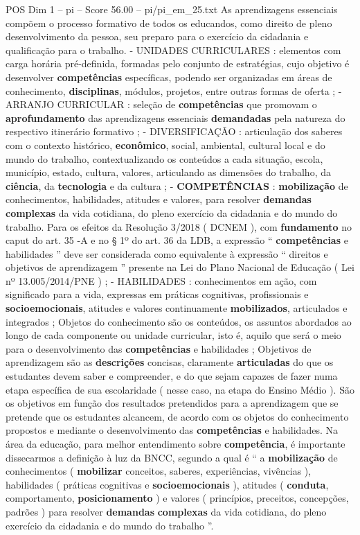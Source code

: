 \begin{textsample}{POS Dim 1 – pi – Score 56.00 – pi/pi\_em\_25.txt}
As aprendizagens essenciais compõem o processo formativo de todos os educandos, como direito de pleno desenvolvimento da pessoa, seu preparo para o exercício da cidadania e qualificação para o trabalho. - UNIDADES CURRICULARES : elementos com carga horária pré-definida, formadas pelo conjunto de estratégias, cujo objetivo é desenvolver \textbf{competências} específicas, podendo ser organizadas em áreas de conhecimento, \textbf{disciplinas}, módulos, projetos, entre outras formas de oferta ; - ARRANJO CURRICULAR : seleção de \textbf{competências} que promovam o \textbf{aprofundamento} das aprendizagens essenciais \textbf{demandadas} pela natureza do respectivo itinerário formativo ; - DIVERSIFICAÇÃO : articulação dos saberes com o contexto histórico, \textbf{econômico}, social, ambiental, cultural local e do mundo do trabalho, contextualizando os conteúdos a cada situação, escola, município, estado, cultura, valores, articulando as dimensões do trabalho, da \textbf{ciência}, da \textbf{tecnologia} e da cultura ; - \textbf{COMPETÊNCIAS} : \textbf{mobilização} de conhecimentos, habilidades, atitudes e valores, para resolver \textbf{demandas} \textbf{complexas} da vida cotidiana, do pleno exercício da cidadania e do mundo do trabalho.
Para os efeitos da Resolução 3/2018 ( DCNEM ), com \textbf{fundamento} no caput do art. 35 -A e no § 1º do art. 36 da LDB, a expressão “ \textbf{competências} e habilidades ” deve ser considerada como equivalente à expressão “ direitos e objetivos de aprendizagem ” presente na Lei do Plano Nacional de Educação ( Lei nº 13.005/2014/PNE ) ; - HABILIDADES : conhecimentos em ação, com significado para a vida, expressas em práticas cognitivas, profissionais e \textbf{socioemocionais}, atitudes e valores continuamente \textbf{mobilizados}, articulados e integrados ; Objetos do conhecimento são os conteúdos, os assuntos abordados ao longo de cada componente ou unidade curricular, isto é, aquilo que será o meio para o desenvolvimento das \textbf{competências} e habilidades ; Objetivos de aprendizagem são as \textbf{descrições} concisas, claramente \textbf{articuladas} do que os estudantes devem saber e compreender, e do que sejam capazes de fazer numa etapa específica de sua escolaridade ( nesse caso, na etapa do Ensino Médio ).
São os objetivos em função dos resultados pretendidos para a aprendizagem que se pretende que os estudantes alcancem, de acordo com os objetos do conhecimento propostos e mediante o desenvolvimento das \textbf{competências} e habilidades.
Na área da educação, para melhor entendimento sobre \textbf{competência}, é importante dissecarmos a definição à luz da BNCC, segundo a qual é “ a \textbf{mobilização} de conhecimentos ( \textbf{mobilizar} conceitos, saberes, experiências, vivências ), habilidades ( práticas cognitivas e \textbf{socioemocionais} ), atitudes ( \textbf{conduta}, comportamento, \textbf{posicionamento} ) e valores ( princípios, preceitos, concepções, padrões ) para resolver \textbf{demandas} \textbf{complexas} da vida cotidiana, do pleno exercício da cidadania e do mundo do trabalho ”.

\end{textsample}
